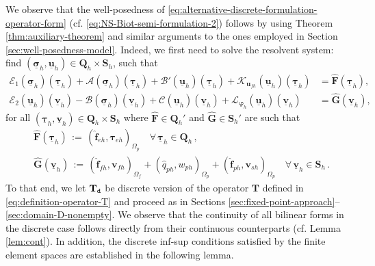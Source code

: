\documentclass[11pt]{article}
\numberwithin{equation}{section}
\newcommand{\bsi}{{\boldsymbol\sigma}}
\newcommand{\bvarphi}{{\boldsymbol\varphi}}
\newcommand{\btau}{{\boldsymbol\tau}}
\newcommand{\ubsi}{\underline{\bsi}}
\newcommand{\ubtau}{\underline{\btau}}
\newcommand{\ubu}{\underline{\bu}}
\newcommand{\ubv}{\underline{\bv}}
\newcommand{\bv}{{\mathbf{v}}}
\newcommand{\f}{\mathbf{f}}
\newcommand{\bu}{\mathbf{u}}
\newcommand{\0}{{\mathbf{0}}}
\def\bF{\mathbf{F}}
\def\bG{\mathbf{G}}
\def\bT{\mathbf{T}}
\def\bQ{\mathbf{Q}}
\def\bS{\mathbf{S}}
\newcommand{\cA}{\mathcal{A}}
\newcommand{\cB}{\mathcal{B}}
\newcommand{\cC}{\mathcal{C}}
\newcommand{\cE}{\mathcal{E}}
\newcommand{\cK}{\mathcal{K}}
\newcommand{\cL}{\mathcal{L}}
\def\wh{\widehat}
\numberwithin{equation}{section}
\begin{document}
We observe that the well-posedness of \eqref{eq:alternative-discrete-formulation-operator-form} (cf. \eqref{eq:NS-Biot-semi-formulation-2}) follows by using Theorem \ref{thm:auxiliary-theorem} and similar arguments to the ones employed in Section \ref{sec:well-posedness-model}.
Indeed, we first need to solve the resolvent system: find $(\ubsi_{h},\ubu_{h})\in \bQ_{h}\times \bS_{h}$, such that
\begin{align}
\cE_1(\ubsi_{h})(\ubtau_{h}) + \cA(\ubsi_{h})(\ubtau_{h}) + \cB'(\ubu_{h})(\ubtau_{h}) + \cK_{\bu_{fh}}(\ubu_{h})(\ubtau_{h}) &= \wh{\bF}(\ubtau_{h}), \nonumber\\ 
\cE_2(\ubu_{h})(\ubv_{h}) - \cB(\ubsi_{h})(\ubv_{h}) + \cC(\ubu_{h})(\ubv_{h})+\cL_{\bvarphi_{h}}(\ubu_{h})(\ubv_{h}) &=  \wh{\bG}(\ubv_{h}),\label{eq:T-auxiliary-discrete-problem-operator-A}
\end{align}
for all $(\ubtau_{h},\ubv_{h})\in \bQ_{h}\times \bS_{h}$ where $\wh{\bF} \in \bQ_{h}'$ and $\wh{\bG} \in \bS_{h}'$ are such that
%
\begin{align*}
& \wh{\bF}(\ubtau_{h}) \,:=\, (\wh{\f}_{eh},\btau_{eh})_{\Omega_p} \quad \forall\,\ubtau_{h} \in \bQ_{h}\,, \nonumber\\ 
& \wh{\bG}(\ubv_{h}) \,:=\, (\wh{\f}_{fh},\bv_{fh})_{\Omega_f} + (\wh{q}_{ph},w_{ph})_{\Omega_p} + (\wh{\f}_{ph},\bv_{sh})_{\Omega_p} \quad \forall\,\ubv_{h} \in \bS_{h}\,.
\nonumber
\end{align*}
To that end, we let $\bT_{\tt d}$ be discrete version of the operator $\bT$ defined in \eqref{eq:definition-operator-T} and proceed as in Sections \ref{sec:fixed-point-approach}--\ref{sec:domain-D-nonempty}.
We observe that the continuity of all bilinear forms in the discrete case follows directly from their continuous counterparts (cf. Lemma \ref{lem:cont}).
In addition, the discrete inf-sup conditions satisfied by the finite element spaces are established in the following lemma.
%
\end{document}
